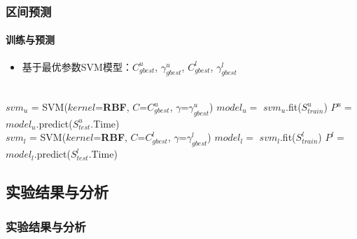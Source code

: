 \begin{frame}
\frametitle{区间预测}
\framesubtitle{训练与预测}
\begin{itemize}
    \item 基于最优参数SVM模型：$C^u_{gbest}$, $\gamma^u_{gbest}$, $C^l_{gbest}$, $\gamma^l_{gbest}$
\end{itemize}
\begin{algorithmic}[1]
    \\
    \State $svm_u$ = SVM($kernel$=\textbf{RBF}, $C$=$C^u_{gbest}$, $\gamma$=$\gamma^u_{gbest}$)
    \State $model_u =$ $svm_u$.fit($S^u_{train}$) 
    \State $P^u =$ $model_u$.predict($S^u_{test}$.Time) 
    \\
    \State $svm_l$ = SVM($kernel$=\textbf{RBF}, $C$=$C^l_{gbest}$, $\gamma$=$\gamma^l_{gbest}$)
    \State $model_l =$ $svm_l$.fit($S^l_{train}$) 
    \State $P^l =$ $model_l$.predict($S^l_{test}$.Time) \\
\end{algorithmic}
\end{frame}

\subsection{实验结果与分析}

\begin{frame}
\frametitle{实验结果与分析}
\end{frame}